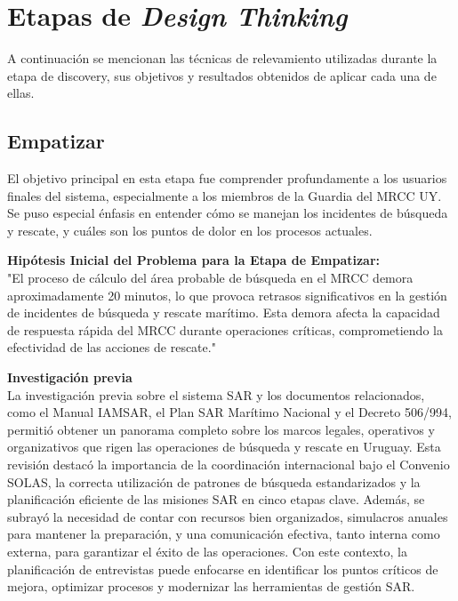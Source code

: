 \section{Etapas de \textit{Design Thinking}}\label{sec:etapasDeDesignThinking}

A continuación se mencionan las técnicas de relevamiento utilizadas durante la etapa de discovery, sus objetivos y resultados obtenidos de aplicar cada una de ellas.

\subsection{Empatizar}

El objetivo principal en esta etapa fue comprender profundamente a los usuarios finales del sistema, especialmente a los miembros de la Guardia del MRCC UY. Se puso 
especial énfasis en entender cómo se manejan los incidentes de búsqueda y rescate, y cuáles son los puntos de dolor en los procesos actuales.

\textbf{Hipótesis Inicial del Problema para la Etapa de Empatizar:}\\
"El proceso de cálculo del área probable de búsqueda en el MRCC demora aproximadamente 20 minutos, lo que provoca retrasos significativos en la gestión de incidentes 
de búsqueda y rescate marítimo. Esta demora afecta la capacidad de respuesta rápida del MRCC durante operaciones críticas, comprometiendo la efectividad de las acciones de rescate."


\textbf{Investigación previa}\\
La investigación previa sobre el sistema SAR y los documentos relacionados, como el Manual IAMSAR, el Plan SAR Marítimo Nacional y el Decreto 506/994, permitió obtener un panorama 
completo sobre los marcos legales, operativos y organizativos que rigen las operaciones de búsqueda y rescate en Uruguay. 
Esta revisión destacó la importancia de la coordinación internacional bajo el Convenio SOLAS, la correcta utilización de patrones de búsqueda estandarizados y la planificación eficiente 
de las misiones SAR en cinco etapas clave. Además, se subrayó la necesidad de contar con recursos bien organizados, simulacros anuales para mantener la preparación, y una comunicación efectiva, 
tanto interna como externa, para garantizar el éxito de las operaciones. 
Con este contexto, la planificación de entrevistas puede enfocarse en identificar los puntos críticos de mejora, optimizar procesos y modernizar las herramientas de gestión SAR.

